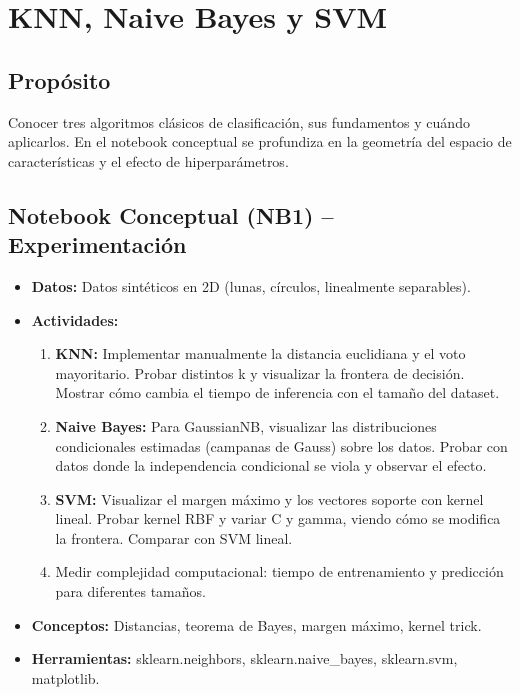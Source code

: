 \documentclass[12pt,a4paper]{article}
\begin{document}
\section{KNN, Naive Bayes y SVM}
\subsection*{Propósito}
Conocer tres algoritmos clásicos de clasificación, sus fundamentos y cuándo aplicarlos. En el notebook conceptual se profundiza en la geometría del espacio de características y el efecto de hiperparámetros.

\subsection*{Notebook Conceptual (NB1) – Experimentación}
\begin{itemize}
    \item \textbf{Datos:} Datos sintéticos en 2D (lunas, círculos, linealmente separables).
    \item \textbf{Actividades:}
    \begin{enumerate}
        \item \textbf{KNN:} Implementar manualmente la distancia euclidiana y el voto mayoritario. Probar distintos k y visualizar la frontera de decisión. Mostrar cómo cambia el tiempo de inferencia con el tamaño del dataset.
        \item \textbf{Naive Bayes:} Para GaussianNB, visualizar las distribuciones condicionales estimadas (campanas de Gauss) sobre los datos. Probar con datos donde la independencia condicional se viola y observar el efecto.
        \item \textbf{SVM:} Visualizar el margen máximo y los vectores soporte con kernel lineal. Probar kernel RBF y variar C y gamma, viendo cómo se modifica la frontera. Comparar con SVM lineal.
        \item Medir complejidad computacional: tiempo de entrenamiento y predicción para diferentes tamaños.
    \end{enumerate}
    \item \textbf{Conceptos:} Distancias, teorema de Bayes, margen máximo, kernel trick.
    \item \textbf{Herramientas:} sklearn.neighbors, sklearn.naive\_bayes, sklearn.svm, matplotlib.
\end{itemize}
\end{document}
